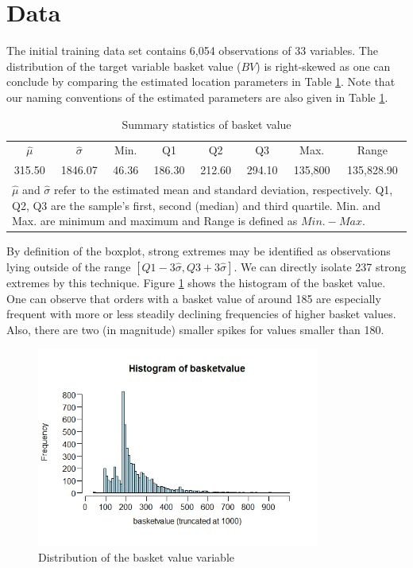 \documentclass[12pt]{article}
\begin{document}
\section{Data}
\label{sect:data}
The initial training data set contains 6,054 observations of 33 variables. The distribution of the target variable basket value ($BV$) is right-skewed as one can conclude by comparing the estimated location parameters in Table \ref{tab:sumbv}. Note that our naming conventions of the estimated parameters are also given in Table \ref{tab:sumbv}.
\begin{table}[ht]
\centering
\begin{tabular}{cccccccc}
  \hline
  \hline
 $\hat{\mu}$ &  $\hat{\sigma}$ & Min. & Q1 & Q2 & Q3 & Max.  & Range\\ 
315.50 & 1846.07 & 46.36 & 186.30 & 212.60 & 294.10 & 135,800 & 135,828.90\\ 
   \hline
   \hline
\multicolumn{8}{l}{ \parbox{5.2in}{\vspace{1pt} \footnotesize{$\hat{\mu}$ and $\hat{\sigma}$  refer to the estimated mean and standard deviation, respectively. Q1, Q2, Q3 are the sample's first, second (median) and third quartile. Min. and Max. are minimum and maximum and Range is defined as $Min. - Max.$}}}
\end{tabular}
\vspace{-5pt}
\caption{Summary statistics of basket value}
\label{tab:sumbv}
\end{table}
By definition of the boxplot, strong extremes may be identified as observations lying outside of the range $[Q1 - 3\hat{\sigma} , Q3 + 3\hat{\sigma}]$. We can directly isolate 237 strong extremes by this technique. 
Figure \ref{fig:histbv} shows the histogram of the basket value. One can observe that orders with a basket value of around 185 are especially frequent with more or less steadily declining frequencies of higher basket values. Also, there are two (in magnitude) smaller spikes for values smaller than 180. 
\begin{figure}[H]
\centering
\includegraphics[width=0.83\textwidth]{histbasket.jpeg}
\vspace{-5pt}
\caption{Distribution of the basket value variable}
\label{fig:histbv}
\end{figure}
\end{document}
